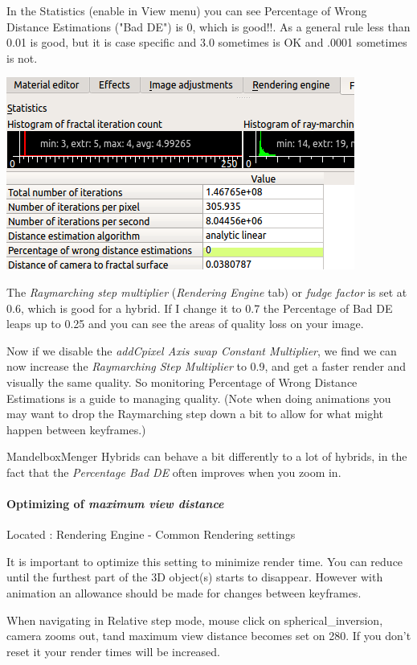 In the Statistics (enable in View menu) you can see Percentage of Wrong Distance
Estimations ("Bad DE") is 0, which is good!!. As a general rule less than 0.01
is good, but it is case specific and 3.0 sometimes is OK and .0001 sometimes is
not.
\nopagebreak

\includegraphics[width=0.5\linewidth]{img/manual/media/mandelboxmenger_statistics.png}

The \emph{Raymarching step multiplier} (\emph{Rendering Engine} tab) or
\emph{fudge factor} is set at 0.6, which is good for a hybrid. If I change it to
0.7 the Percentage of Bad DE leaps up to 0.25 and you can see the areas of
quality loss on your image.

Now if we disable the \emph{addCpixel Axis swap Constant Multiplier}, we find we
can now increase the \emph{Raymarching Step Multiplier} to 0.9, and get a faster
render and visually the same quality. So monitoring Percentage of Wrong Distance
Estimations is a guide to managing quality. (Note when doing animations you may
want to drop the Raymarching step down a bit to allow for what might happen
between keyframes.)

MandelboxMenger Hybrids can behave a bit differently to a lot of hybrids, in the
fact that the \emph{Percentage Bad DE} often improves when you zoom in.

\paragraph{Optimizing of \emph{maximum view distance}} Located : Rendering
Engine - Common Rendering settings

It is important to optimize this setting to minimize render time. You can reduce
until the furthest part of the 3D object(s) starts to disappear. However with
animation an allowance should be made for changes between keyframes.

\begin{notebox}[Note] When navigating in Relative step mode, mouse click on
	spherical\_inversion, camera zooms out, tand maximum view distance becomes set
	on 280. If you don't reset it your render times will be increased. \end{notebox}

